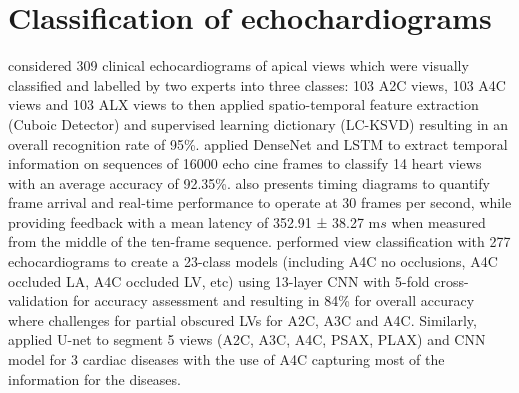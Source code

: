 \documentclass[mlabstract,twocolumn]{jmlr}
\begin{document}
\section{Classification of echochardiograms} \label{subsec:nns_echochardiograms}
\citet{khamis2017} considered 309 clinical echocardiograms of apical views which were visually classified and labelled by two experts into three classes: 103 A2C views, 103 A4C views and 103 ALX views to then applied spatio-temporal feature extraction (Cuboic Detector) and supervised learning dictionary (LC-KSVD) resulting in an overall recognition rate of 95\%.
\citet{woudenberg2018} applied DenseNet and LSTM to extract temporal information on sequences of 16000 echo cine frames to classify 14 heart views with an average accuracy of 92.35\%.
\citet{woudenberg2018} also presents timing diagrams to quantify frame arrival and real-time performance to operate at 30 frames per second, while providing feedback with a mean latency of 352.91 ± 38.27 m$s$ when measured from the middle of the ten-frame sequence.
\citet{zhang2018} performed view classification with 277 echocardiograms to create a 23-class models (including A4C no occlusions, A4C occluded LA, A4C occluded LV, etc) using 13-layer CNN with 5-fold cross-validation for accuracy assessment and resulting in 84\% for overall accuracy where challenges for partial obscured LVs for A2C, A3C and A4C.
Similarly, \citet{zhang2018} applied U-net to segment 5 views (A2C, A3C, A4C, PSAX, PLAX) and CNN model for 3 cardiac diseases with the use of A4C capturing most of the information for the diseases.

\newpage
\end{document}
